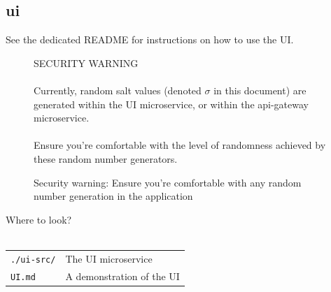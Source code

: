 \documentclass{article}
\begin{document}
\subsection{ui}
\label{sec:ui}

See the dedicated README for instructions on how to use the UI.\\

\begin{figure}[H]
  \begin{center}
    \begin{mdframed}[backgroundcolor=verylightred]
      \noindent
      SECURITY WARNING\\
      \\
      Currently, random salt values (denoted $\sigma$ in this document) are generated within the UI microservice, or within the api-gateway microservice.\\
      \\
      Ensure you're comfortable with the level of randomness achieved by these random number generators.
    \end{mdframed}
  \end{center}
  \caption{Security warning: Ensure you're comfortable with any random number generation in the application}
\end{figure}


\begin{center}
  \begin{mdframed}[backgroundcolor=verylightblue]
    Where to look?\\
    \\
    \begin{tabular}{lp{14cm}}
      \texttt{./ui-src/} & The UI microservice\\
      \texttt{UI.md} & A demonstration of the UI\\
    \end{tabular}
  \end{mdframed}
\end{center}
\end{document}
